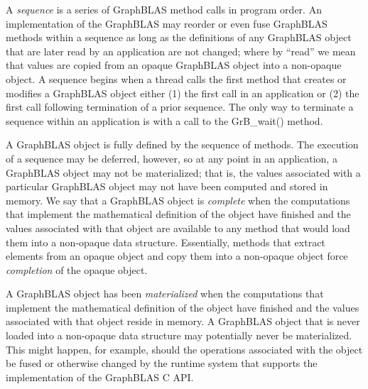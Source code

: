  A \emph{sequence} is a series of GraphBLAS method calls in program order.  
An implementation of the GraphBLAS may reorder or even fuse GraphBLAS methods within a 
sequence as long as the definitions of any GraphBLAS object that are later read by an application 
are not changed; where by ``read'' we mean that values are copied from an opaque GraphBLAS 
object into a non-opaque object.  A sequence begins when a thread calls the first method that creates
or modifies a GraphBLAS object either (1) the first call in an application or (2) the first call 
following termination of a prior sequence.  The only way to terminate a sequence within an 
application is with a call to the GrB\_wait() method. 

 A GraphBLAS object is fully defined by the sequence of methods.   
The execution of a sequence may be deferred, however, so at any point 
in an application, a GraphBLAS object may not be materialized; that is, 
the values associated with a particular GraphBLAS object may not have 
been computed and stored in memory.   We say that a GraphBLAS object is \emph{complete} 
when the computations that implement the mathematical definition of the object have 
finished and the values associated with that object are available to any method that would 
load them into a non-opaque data structure.   Essentially, methods that extract elements 
from an opaque object and copy them into a non-opaque object force \emph{completion} of the
opaque object. 

 A GraphBLAS object has been \emph{materialized} when 
the computations that implement the mathematical definition of the object 
have finished and the values associated with that object reside in memory.   
A GraphBLAS object that is never loaded into a non-opaque data structure may 
potentially never be materialized.  This might happen, for  example, should the operations 
associated with the object be fused or otherwise changed by the runtime system 
that supports the implementation of the GraphBLAS C API.   

